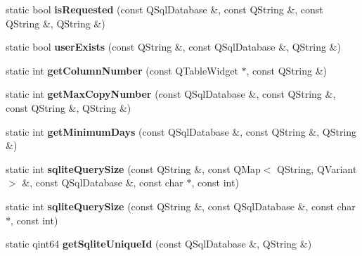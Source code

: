 \begin{DoxyCompactItemize}
\item 
static bool {\bfseries is\+Requested} (const Q\+Sql\+Database \&, const Q\+String \&, const Q\+String \&, Q\+String \&)\hypertarget{classbiblioteq__misc__functions_a177bb20f20439dc028958786b9022281}{}\label{classbiblioteq__misc__functions_a177bb20f20439dc028958786b9022281}

\item 
static bool {\bfseries user\+Exists} (const Q\+String \&, const Q\+Sql\+Database \&, Q\+String \&)\hypertarget{classbiblioteq__misc__functions_af80741789bb6b2828cac12f24ba3a9e3}{}\label{classbiblioteq__misc__functions_af80741789bb6b2828cac12f24ba3a9e3}

\item 
static int {\bfseries get\+Column\+Number} (const Q\+Table\+Widget $\ast$, const Q\+String \&)\hypertarget{classbiblioteq__misc__functions_a67ee6fed14e86e67c2b7330e53a114ba}{}\label{classbiblioteq__misc__functions_a67ee6fed14e86e67c2b7330e53a114ba}

\item 
static int {\bfseries get\+Max\+Copy\+Number} (const Q\+Sql\+Database \&, const Q\+String \&, const Q\+String \&, Q\+String \&)\hypertarget{classbiblioteq__misc__functions_a789674e0da5a26b80ae01185c460fc90}{}\label{classbiblioteq__misc__functions_a789674e0da5a26b80ae01185c460fc90}

\item 
static int {\bfseries get\+Minimum\+Days} (const Q\+Sql\+Database \&, const Q\+String \&, Q\+String \&)\hypertarget{classbiblioteq__misc__functions_ab6bc05eed477c0a6b0a0a78261fc2b84}{}\label{classbiblioteq__misc__functions_ab6bc05eed477c0a6b0a0a78261fc2b84}

\item 
static int {\bfseries sqlite\+Query\+Size} (const Q\+String \&, const Q\+Map$<$ Q\+String, Q\+Variant $>$ \&, const Q\+Sql\+Database \&, const char $\ast$, const int)\hypertarget{classbiblioteq__misc__functions_a7da669ab5564280f7eb1d2dfabd4fb5d}{}\label{classbiblioteq__misc__functions_a7da669ab5564280f7eb1d2dfabd4fb5d}

\item 
static int {\bfseries sqlite\+Query\+Size} (const Q\+String \&, const Q\+Sql\+Database \&, const char $\ast$, const int)\hypertarget{classbiblioteq__misc__functions_a6ca05ce3a6070c31c12acc2ba116d2d2}{}\label{classbiblioteq__misc__functions_a6ca05ce3a6070c31c12acc2ba116d2d2}

\item 
static qint64 {\bfseries get\+Sqlite\+Unique\+Id} (const Q\+Sql\+Database \&, Q\+String \&)\hypertarget{classbiblioteq__misc__functions_abb1253eaa22f44836e54ca3bc25c3b69}{}\label{classbiblioteq__misc__functions_abb1253eaa22f44836e54ca3bc25c3b69}


\end{DoxyCompactItemize}
